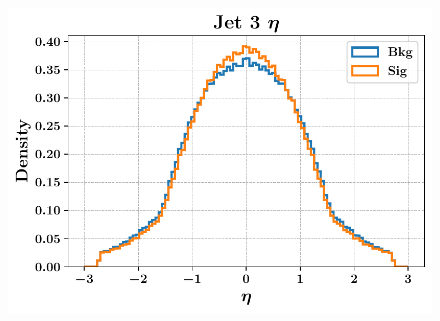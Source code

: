 \documentclass[xcolor=table,8pt]{beamer}
\begin{document}
\begin{frame}[t]
\begin{figure}[!h]
\begin{minipage}[c]{0.25\linewidth}
{                    \includegraphics[width=\textwidth]{images/theory/lowlevel/j3_eta.pdf}
                    \label{fig:appendix_low_features_hadronic_j3_eta}
                }
            \end{minipage}%
            \begin{minipage}[c]{0.25\linewidth}
                \vspace{0pt}
                \centering
            \end{minipage}%
            \begin{minipage}[c]{0.25\linewidth}

\end{minipage}
\end{figure}
\end{frame}
\end{document}
